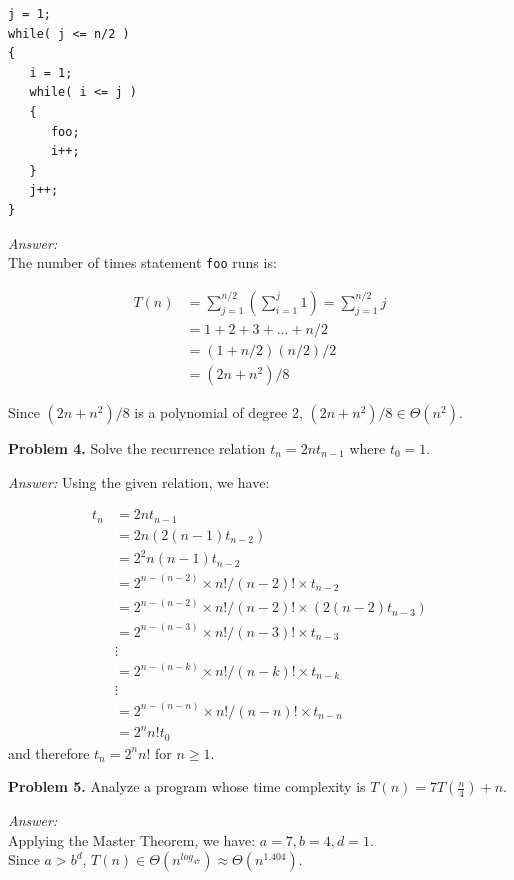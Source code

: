 \documentclass[12pt]{article}
\begin{document}
\begin{verbatim}
j = 1;
while( j <= n/2 )
{
   i = 1;
   while( i <= j )
   {
      foo;
      i++;
   }
   j++;
}
\end{verbatim}


\textit{Answer:} \\
The number of times statement \texttt{foo} runs is:

\begin{align*}
T(n) &= \sum\limits_{j=1}^{n/2}(\sum\limits_{i=1}^j 1) = \sum\limits_{j=1}^{n/2} j  \\
&= 1 + 2 + 3 + ... + n/2 \\
&= (1 + n/2)(n/2)/2 \\
&= (2n + n^2)/8
\end{align*}

Since $(2n + n^2)/8$ is a polynomial of degree 2, $(2n + n^2)/8 \in \Theta(n^2)$. 


\textbf{Problem 4.} Solve the recurrence relation $t_n = 2nt_{n - 1}$
  where $t_0 = 1$.

\textit{Answer:} Using the given relation, we have:

\begin{align*}
t_n  &= 2nt_{n - 1} \\
     &= 2n(2(n - 1)t_{n - 2}) \\
     &= 2^2n(n - 1)t_{n - 2} \\
     &= 2^{n - (n - 2)} \times n!/(n - 2)! \times t_{n - 2} \\
     &= 2^{n - (n - 2)} \times n!/(n - 2)! \times (2(n - 2)t_{n - 3}) \\
     &= 2^{n - (n - 3)} \times n!/(n - 3)! \times t_{n - 3} \\
     & \vdots \\
     &= 2^{n - (n - k)} \times n!/(n - k)! \times t_{n - k} \\
     & \vdots \\
     &= 2^{n - (n - n)} \times n!/(n - n)! \times t_{n - n} \\
     &= 2^n n! t_0
\end{align*}
and therefore $t_n = 2^nn!$ for $n \geq 1$.

\textbf{Problem 5.} Analyze a program whose time complexity is $T(n) =
7T(\frac{n}{4}) + n$.

\textit{Answer:} \\
Applying the Master Theorem, we have: $a = 7, b = 4, d = 1$. \\
Since $a > b^d$, $T(n) \in \Theta(n^{log_47}) \approx \Theta(n^{1.404})$. 
\end{document}
